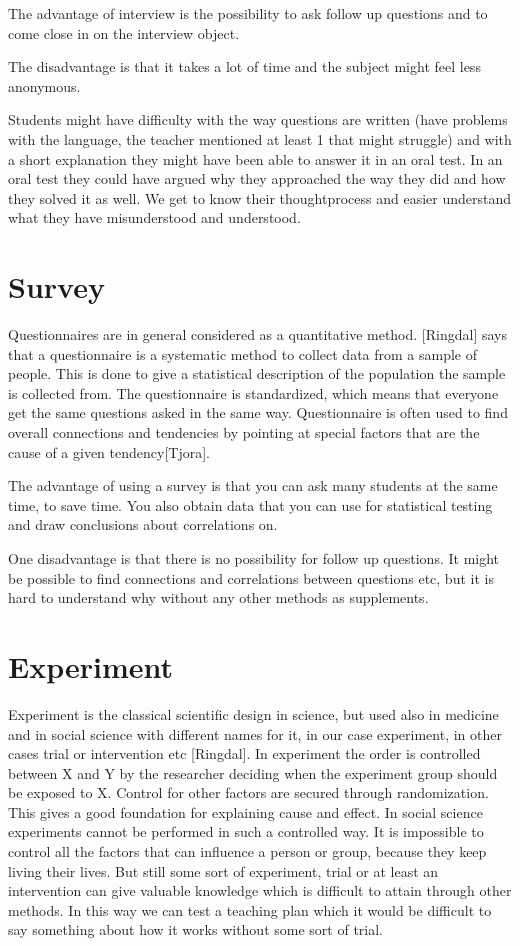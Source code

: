 \bigskip\noindent
The advantage of interview  is the possibility to ask follow up questions and to come close in on the interview object.

\bigskip\noindent
The disadvantage is that it takes a lot of time and the subject might feel less anonymous.

\bigskip\noindent
Students might have difficulty with the way questions are written (have problems with the language, the teacher mentioned at least 1 that might struggle) and with a short explanation they might have been able to answer it in an oral test. In an oral test they could have argued why they approached the way they did and how they solved it as well. We get to know their thoughtprocess and easier understand what they have misunderstood and understood.  
\section{Survey}
Questionnaires are in general considered as a quantitative method. [Ringdal] says that a questionnaire is a systematic method to collect data from a sample of people. This is done to give a statistical description of the population the sample is collected from. The questionnaire is standardized, which means that everyone get the same questions asked in the same way. Questionnaire is often used to find overall connections and tendencies by pointing at special factors that are the cause of a given tendency[Tjora]. 

\bigskip\noindent
The advantage of using a survey is that you can ask many students at the same time, to save time. You also obtain data that you can use for statistical testing and draw conclusions about correlations on. 

\bigskip\noindent
One disadvantage is that there is no possibility for follow up questions. It might be possible to find connections and correlations between questions etc, but it is hard to understand why without any other methods as supplements.
\section{Experiment}
Experiment is the classical scientific design in science, but used also in medicine and in social science with different names for it, in our case experiment, in other cases trial or intervention etc [Ringdal]. In experiment the order is controlled between X and Y by the researcher deciding when the experiment group should be exposed to X. Control for other factors are secured through randomization. This gives a good foundation for explaining cause and effect. In social science experiments cannot be performed in such a controlled way. It is impossible to control all the factors that can influence a person or group, because they keep living their lives. But still some sort of experiment, trial or at least an intervention can give valuable knowledge which is difficult to attain through other methods. In this way we can test a teaching plan which it would be difficult to say something about how it works without some sort of trial. 

